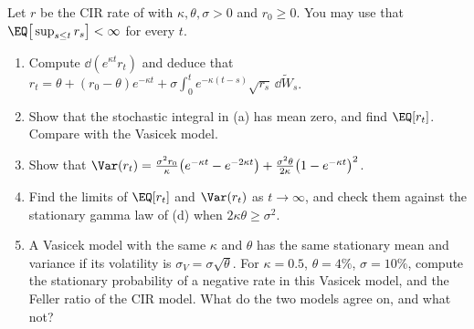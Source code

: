 \begin{exercise}\label{ex:ir-cir-moments}
\medium Let $r$ be the CIR rate of  with $\kappa,\theta,\sigma>0$ and $r_0\ge0$. You
may use that $\EQ\big[\sup_{s\le t}r_s\big]<\infty$ for every $t$.
\begin{enumerate}[label=(\alph*)]
  \item Compute $\dd(e^{\kappa t}r_t)$ and deduce that
    $r_t=\theta+(r_0-\theta)e^{-\kappa t}+\sigma\int_0^te^{-\kappa(t-s)}\sqrt{r_s}\,\dd\widetilde W_s$.
  \item Show that the stochastic integral in (a) has mean zero, and find $\EQ[r_t]$. Compare with the
    Vasicek model.
  \item Show that
    $\Var(r_t)=\frac{\sigma^2r_0}{\kappa}\big(e^{-\kappa t}-e^{-2\kappa t}\big)+\frac{\sigma^2\theta}{2\kappa}\big(1-e^{-\kappa t}\big)^2$.
  \item Find the limits of $\EQ[r_t]$ and $\Var(r_t)$ as $t\to\infty$, and check them against the
    stationary gamma law of (d) when $2\kappa\theta\ge\sigma^2$.
  \item A Vasicek model with the same $\kappa$ and $\theta$ has the same stationary mean and variance
    if its volatility is $\sigma_V=\sigma\sqrt\theta$. For $\kappa=0.5$, $\theta=4\%$, $\sigma=10\%$, compute
    the stationary probability of a negative rate in this Vasicek model, and the Feller ratio of the
    CIR model. What do the two models agree on, and what not?
\end{enumerate}
\end{exercise}

